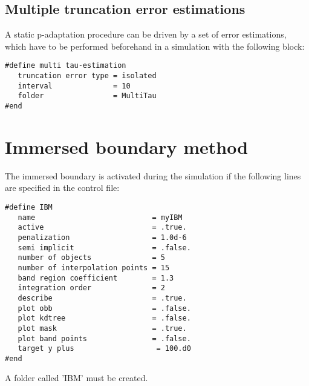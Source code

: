 \documentclass[a4paper,10pt]{report}
\begin{document}
\section{Multiple truncation error estimations} \label{sec:MultiTau}
A static p-adaptation procedure can be driven by a set of error estimations, which have to be performed beforehand in a simulation with the following block:

\begin{lstlisting}
#define multi tau-estimation
   truncation error type = isolated
   interval              = 10
   folder                = MultiTau
#end
\end{lstlisting}


\chapter{Immersed boundary method}

The immersed boundary is activated during the simulation if the following lines are specified in the control file:
\begin{lstlisting}
#define IBM
   name                           = myIBM
   active                         = .true.
   penalization                   = 1.0d-6
   semi implicit                  = .false.
   number of objects              = 5 
   number of interpolation points = 15
   band region coefficient        = 1.3
   integration order              = 2
   describe                       = .true.
   plot obb                       = .false.
   plot kdtree                    = .false.
   plot mask                      = .true.
   plot band points               = .false.
   target y plus                   = 100.d0
#end
\end{lstlisting}

A folder called 'IBM' must be created.
\end{document}
